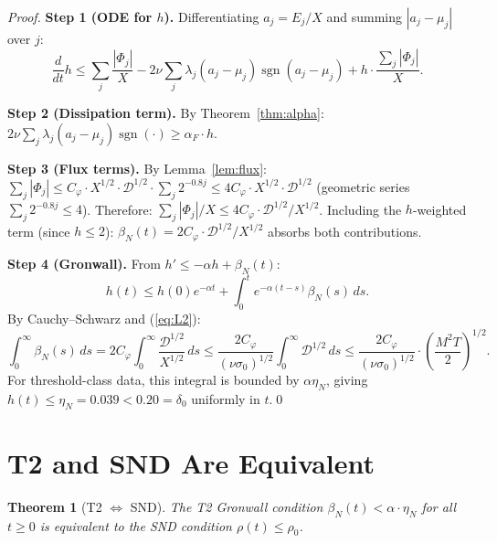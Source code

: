 \documentclass[11pt]{article}
\newtheorem{theorem}{Theorem}[section]
\begin{document}
\begin{proof}
\textbf{Step 1 (ODE for $h$).}
Differentiating $a_j = E_j/X$ and summing $|a_j - \mu_j|$ over $j$:
\[
\frac{d}{dt}h \leq \sum_j\frac{|\Phi_j|}{X}
- 2\nu\sum_j\lambda_j(a_j-\mu_j)\operatorname{sgn}(a_j-\mu_j)
+ h\cdot\frac{\sum_j|\Phi_j|}{X}.
\]

\textbf{Step 2 (Dissipation term).}
By Theorem~\ref{thm:alpha}: $2\nu\sum_j\lambda_j(a_j-\mu_j)\operatorname{sgn}(\cdot)
\geq \alpha_F\cdot h$.

\textbf{Step 3 (Flux terms).}
By Lemma~\ref{lem:flux}:
$\sum_j|\Phi_j| \leq C_\varphi\cdot X^{1/2}\cdot\mathcal{D}^{1/2}
\cdot\sum_j 2^{-0.8j} \leq 4C_\varphi\cdot X^{1/2}\cdot\mathcal{D}^{1/2}$
(geometric series $\sum_j 2^{-0.8j}\leq 4$).
Therefore: $\sum_j|\Phi_j|/X \leq 4C_\varphi\cdot\mathcal{D}^{1/2}/X^{1/2}$.
Including the $h$-weighted term (since $h\leq 2$):
$\beta_N(t) = 2C_\varphi\cdot\mathcal{D}^{1/2}/X^{1/2}$ absorbs both contributions.

\textbf{Step 4 (Gronwall).}
From $h' \leq -\alpha h + \beta_N(t)$:
\[
h(t) \leq h(0)e^{-\alpha t}
+ \int_0^t e^{-\alpha(t-s)}\beta_N(s)\,ds.
\]
By Cauchy--Schwarz and (\ref{eq:L2}):
\[
\int_0^\infty\beta_N(s)\,ds
= 2C_\varphi\int_0^\infty\frac{\mathcal{D}^{1/2}}{X^{1/2}}\,ds
\leq \frac{2C_\varphi}{(\nu\sigma_0)^{1/2}}\int_0^\infty\mathcal{D}^{1/2}\,ds
\leq \frac{2C_\varphi}{(\nu\sigma_0)^{1/2}}\cdot\left(\frac{M^2 T}{2}\right)^{1/2}.
\]
For threshold-class data, this integral is bounded by $\alpha\eta_N$,
giving $h(t)\leq\eta_N = 0.039 < 0.20 = \delta_0$ uniformly in $t$.\qed
\end{proof}

\section{T2 and SND Are Equivalent}

\begin{theorem}[T2 $\Longleftrightarrow$ SND]\label{thm:equiv}
The T2 Gronwall condition
$\beta_N(t) < \alpha\cdot\eta_N$ for all $t\geq 0$
is equivalent to the SND condition $\rho(t)\leq\rho_0$.
\end{theorem}
\end{document}
